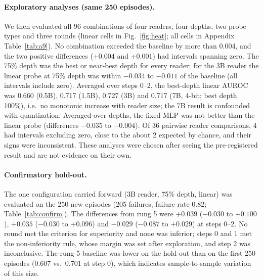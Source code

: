 \documentclass[11pt]{article}
\begin{document}
\paragraph{Exploratory analyses (same 250 episodes).} We then evaluated all 96 combinations of four readers, four depths, two probe types and three rounds (linear cells in Fig.~\ref{fig:heat}; all cells in Appendix Table~\ref{tab:a9}).
No combination exceeded the baseline by more than 0.004, and the two positive differences ($+0.004$ and $+0.001$) had intervals spanning zero.
The 75\% depth was the best or near-best depth for every reader; for the 3B reader the linear probe at 75\% depth was within $-0.034$ to $-0.011$ of the baseline (all intervals include zero).
Averaged over steps 0--2, the best-depth linear AUROC was 0.660 (0.5B), 0.717 (1.5B), 0.727 (3B) and 0.717 (7B, 4-bit; best depth 100\%), i.e.\ no monotonic increase with reader size;
the 7B result is confounded with quantization. Averaged over depths, the fixed MLP was not better than the linear probe (differences $-0.035$ to $-0.004$).
Of 36 pairwise reader comparisons, 4 had intervals excluding zero, close to the about 2 expected by chance, and their signs were inconsistent.
These analyses were chosen after seeing the pre-registered result and are not evidence on their own.

\paragraph{Confirmatory hold-out.} The one configuration carried forward (3B reader, 75\% depth, linear) was evaluated on the 250 new episodes
(205 failures, failure rate 0.82; Table~\ref{tab:confirm}). The differences from rung 5 were $+0.039$ ($-0.030$ to $+0.100$), $+0.035$ ($-0.030$ to $+0.096$) and $-0.029$ ($-0.087$ to $+0.029$) at steps 0--2.
No round met the criterion for superiority and none was inferior; steps 0 and 1 met the non-inferiority rule, whose margin was set after exploration, and step 2 was inconclusive.
The rung-5 baseline was lower on the hold-out than on the first 250 episodes (0.607 vs.\ 0.701 at step 0), which indicates sample-to-sample variation of this size.
\end{document}
